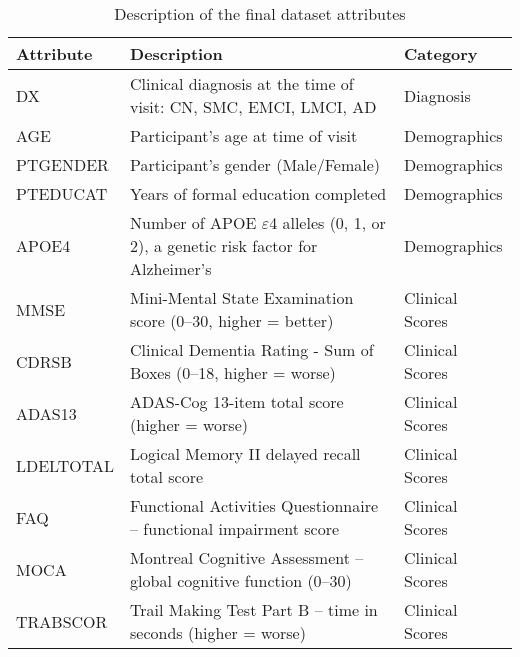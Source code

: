 \newpage

\begin{table}[H]
	\small
	\centering
	\caption{Description of the final dataset attributes}
	\label{tab:dataset-attributes}
	\begin{adjustbox}{max width=\textwidth}
		\begin{tabularx}{\textwidth}{>{\raggedright\arraybackslash}p{3cm} >{\raggedright\arraybackslash}X >{\raggedright\arraybackslash}p{3cm}}
			\toprule
			\textbf{Attribute} & \textbf{Description} & \textbf{Category} \\
			\midrule
			DX                    & Clinical diagnosis at the time of visit: CN, SMC, EMCI, LMCI, AD                   & Diagnosis             \\
			AGE                   & Participant’s age at time of visit                                                 & Demographics          \\
			PTGENDER              & Participant's gender (Male/Female)                                                 & Demographics          \\
			PTEDUCAT              & Years of formal education completed                                                & Demographics          \\
			APOE4                 & Number of APOE $\varepsilon$4 alleles (0, 1, or 2), a genetic risk factor for Alzheimer’s      & Demographics          \\
			MMSE                  & Mini-Mental State Examination score (0–30, higher = better)                        & Clinical Scores       \\
			CDRSB                 & Clinical Dementia Rating - Sum of Boxes (0–18, higher = worse)                     & Clinical Scores       \\
			ADAS13                & ADAS-Cog 13-item total score (higher = worse)                                      & Clinical Scores       \\
			LDELTOTAL             & Logical Memory II delayed recall total score                                       & Clinical Scores       \\
			FAQ                   & Functional Activities Questionnaire – functional impairment score                  & Clinical Scores       \\
			MOCA                  & Montreal Cognitive Assessment – global cognitive function (0–30)                   & Clinical Scores       \\
			TRABSCOR              & Trail Making Test Part B – time in seconds (higher = worse)                        & Clinical Scores       \\

\end{tabularx}
\end{adjustbox}
\end{table}
